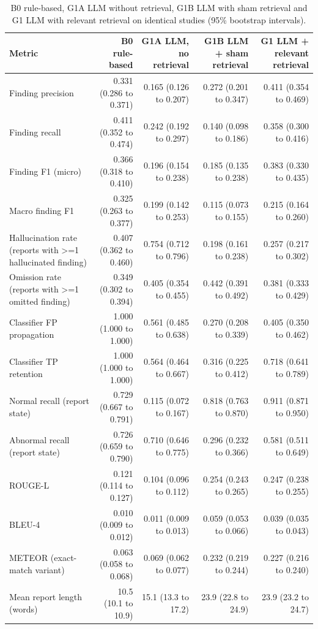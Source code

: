 \begin{table}[t]
\centering
\scriptsize
\begin{tabular}{lrrrr}
\hline
Metric & B0 rule-based & G1A LLM, no retrieval & G1B LLM + sham retrieval & G1 LLM + relevant retrieval \\
\hline
Finding precision & 0.331 (0.286 to 0.371) & 0.165 (0.126 to 0.207) & 0.272 (0.201 to 0.347) & 0.411 (0.354 to 0.469) \\
Finding recall & 0.411 (0.352 to 0.474) & 0.242 (0.192 to 0.297) & 0.140 (0.098 to 0.186) & 0.358 (0.300 to 0.416) \\
Finding F1 (micro) & 0.366 (0.318 to 0.410) & 0.196 (0.154 to 0.238) & 0.185 (0.135 to 0.238) & 0.383 (0.330 to 0.435) \\
Macro finding F1 & 0.325 (0.263 to 0.377) & 0.199 (0.142 to 0.253) & 0.115 (0.073 to 0.155) & 0.215 (0.164 to 0.260) \\
Hallucination rate (reports with >=1 hallucinated finding) & 0.407 (0.362 to 0.460) & 0.754 (0.712 to 0.796) & 0.198 (0.161 to 0.238) & 0.257 (0.217 to 0.302) \\
Omission rate (reports with >=1 omitted finding) & 0.349 (0.302 to 0.394) & 0.405 (0.354 to 0.455) & 0.442 (0.391 to 0.492) & 0.381 (0.333 to 0.429) \\
Classifier FP propagation & 1.000 (1.000 to 1.000) & 0.561 (0.485 to 0.638) & 0.270 (0.208 to 0.339) & 0.405 (0.350 to 0.462) \\
Classifier TP retention & 1.000 (1.000 to 1.000) & 0.564 (0.464 to 0.667) & 0.316 (0.225 to 0.412) & 0.718 (0.641 to 0.789) \\
Normal recall (report state) & 0.729 (0.667 to 0.791) & 0.115 (0.072 to 0.167) & 0.818 (0.763 to 0.870) & 0.911 (0.871 to 0.950) \\
Abnormal recall (report state) & 0.726 (0.659 to 0.790) & 0.710 (0.646 to 0.775) & 0.296 (0.232 to 0.366) & 0.581 (0.511 to 0.649) \\
ROUGE-L & 0.121 (0.114 to 0.127) & 0.104 (0.096 to 0.112) & 0.254 (0.243 to 0.265) & 0.247 (0.238 to 0.255) \\
BLEU-4 & 0.010 (0.009 to 0.012) & 0.011 (0.009 to 0.013) & 0.059 (0.053 to 0.066) & 0.039 (0.035 to 0.043) \\
METEOR (exact-match variant) & 0.063 (0.058 to 0.068) & 0.069 (0.062 to 0.077) & 0.232 (0.219 to 0.244) & 0.227 (0.216 to 0.240) \\
Mean report length (words) & 10.5 (10.1 to 10.9) & 15.1 (13.3 to 17.2) & 23.9 (22.8 to 24.9) & 23.9 (23.2 to 24.7) \\
\hline
\end{tabular}
\caption{B0 rule-based, G1A LLM without retrieval, G1B LLM with sham retrieval and G1 LLM with relevant retrieval on identical studies (95\% bootstrap intervals).}
\label{tab:table1_four_system_main_comparison}
\end{table}
